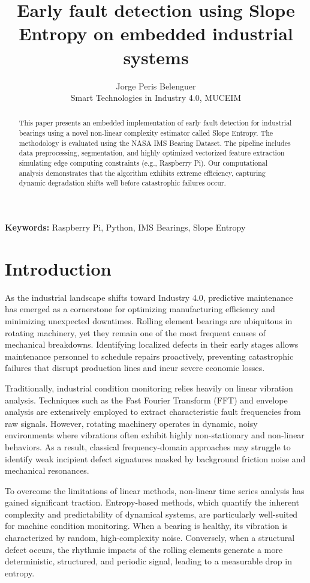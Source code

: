 \documentclass{article}
\title{Early fault detection using Slope Entropy on embedded industrial systems}
\author{Jorge Peris Belenguer \\ Smart Technologies in Industry 4.0, MUCEIM}
\date{}
\begin{document}
\maketitle

\begin{abstract}
This paper presents an embedded implementation of early fault detection for industrial bearings using a novel non-linear complexity estimator called Slope Entropy. The methodology is evaluated using the NASA IMS Bearing Dataset. The pipeline includes data preprocessing, segmentation, and highly optimized vectorized feature extraction simulating edge computing constraints (e.g., Raspberry Pi). Our computational analysis demonstrates that the algorithm exhibits extreme efficiency, capturing dynamic degradation shifts well before catastrophic failures occur.
\end{abstract}

\textbf{Keywords:} Raspberry Pi, Python, IMS Bearings, Slope Entropy


\section{Introduction}
As the industrial landscape shifts toward Industry 4.0, predictive maintenance has emerged as a cornerstone for optimizing manufacturing efficiency and minimizing unexpected downtimes. Rolling element bearings are ubiquitous in rotating machinery, yet they remain one of the most frequent causes of mechanical breakdowns. Identifying localized defects in their early stages allows maintenance personnel to schedule repairs proactively, preventing catastrophic failures that disrupt production lines and incur severe economic losses.

Traditionally, industrial condition monitoring relies heavily on linear vibration analysis. Techniques such as the Fast Fourier Transform (FFT) and envelope analysis are extensively employed to extract characteristic fault frequencies from raw signals. However, rotating machinery operates in dynamic, noisy environments where vibrations often exhibit highly non-stationary and non-linear behaviors. As a result, classical frequency-domain approaches may struggle to identify weak incipient defect signatures masked by background friction noise and mechanical resonances.

To overcome the limitations of linear methods, non-linear time series analysis has gained significant traction. Entropy-based methods, which quantify the inherent complexity and predictability of dynamical systems, are particularly well-suited for machine condition monitoring. When a bearing is healthy, its vibration is characterized by random, high-complexity noise. Conversely, when a structural defect occurs, the rhythmic impacts of the rolling elements generate a more deterministic, structured, and periodic signal, leading to a measurable drop in entropy.
\end{document}
